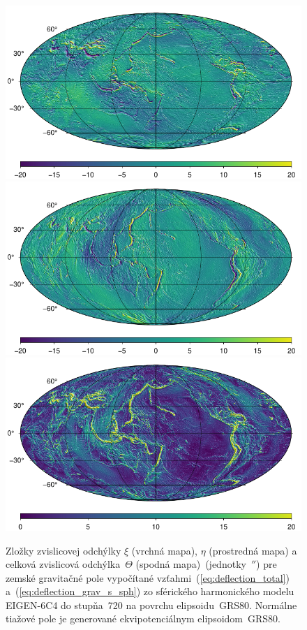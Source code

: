 \documentclass[a4paper, 12pt]{book}
\begin{document}
\begin{figure}
\centering
\includegraphics{./fig-deflections-xi.pdf}
\includegraphics{./fig-deflections-eta.pdf}
\includegraphics{./fig-deflections-theta.pdf}
\caption{Zložky zvislicovej odchýlky $\xi$ (vrchná mapa), $\eta$ (prostredná 
mapa) a celková zvislicová odchýlka~$\Theta$ (spodná mapa)~(jednotky~$''$) pre 
zemské gravitačné pole vypočítané vzťahmi~(\ref{eq:deflection_total}) 
a~(\ref{eq:deflection_grav_s_sph}) zo sférického harmonického modelu EIGEN-6C4 
do stupňa~720 na povrchu elipsoidu~GRS80.  Normálne tiažové pole je generované 
ekvipotenciálnym elipsoidom~GRS80.}
\label{fig:deflections_ggm}
\end{figure}
\end{document}
